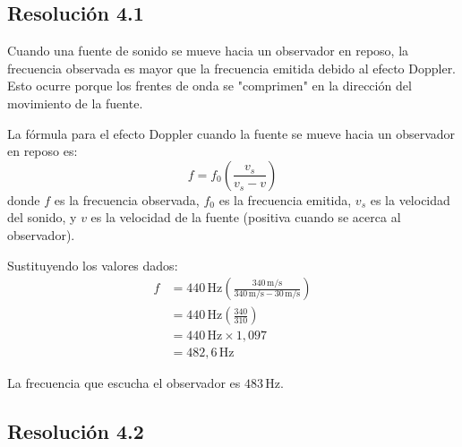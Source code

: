 \documentclass[
  11pt,
  letterpaper,
   addpoints,
   answers
  ]{exam}
\begin{document}
\begin{questions}
\begin{solution}
\subsection*{Resolución 4.1}

Cuando una fuente de sonido se mueve hacia un observador en reposo, la frecuencia observada es mayor que la frecuencia emitida debido al efecto Doppler. Esto ocurre porque los frentes de onda se "comprimen" en la dirección del movimiento de la fuente.

La fórmula para el efecto Doppler cuando la fuente se mueve hacia un observador en reposo es:
\begin{equation}
f = f_0 \left(\frac{v_s}{v_s - v}\right)
\end{equation}
donde $f$ es la frecuencia observada, $f_0$ es la frecuencia emitida, $v_s$ es la velocidad del sonido, y $v$ es la velocidad de la fuente (positiva cuando se acerca al observador).

Sustituyendo los valores dados:
\begin{align}
f &= 440\,\mathrm{Hz} \left(\frac{340\,\mathrm{m/s}}{340\,\mathrm{m/s} - 30\,\mathrm{m/s}}\right) \\
&= 440\,\mathrm{Hz} \left(\frac{340}{310}\right) \\
&= 440\,\mathrm{Hz} \times 1{,}097 \\
&= 482{,}6\,\mathrm{Hz}
\end{align}

La frecuencia que escucha el observador es $\boxed{483\,\mathrm{Hz}}$.

\subsection*{Resolución 4.2}


\end{solution}
\end{questions}
\end{document}
